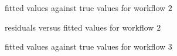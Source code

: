 \documentclass{article}
\begin{document}
\begin{figure}[!htbp]
\centering
{}
\caption{fitted values against true values for workflow $2$} \label{1d2_21}
\end{figure}

\begin{figure}[!htbp]
\centering
{}
\caption{residuals versus fitted values for workflow $2$} \label{1d2_22}
\end{figure}

\begin{figure}[!htbp]
\centering
{}
\caption{fitted values against true values for workflow $3$} \label{1d2_31}
\end{figure}
\end{document}
